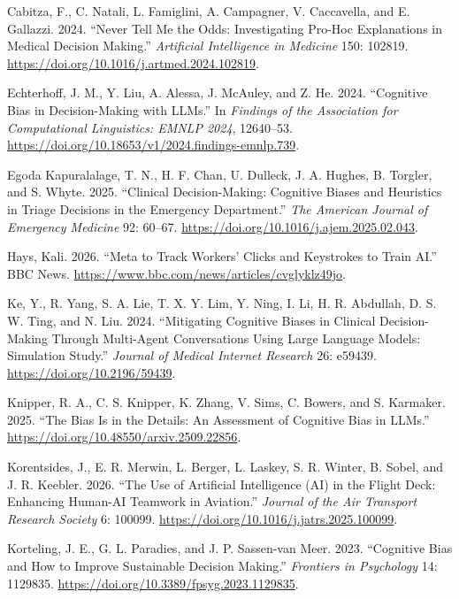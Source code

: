 \documentclass[
  letterpaper,
  DIV=11,
  numbers=noendperiod]{scrartcl}
\newlength{\cslhangindent}
\newenvironment{CSLReferences}[2] %
 {\begin{list}{}{%
  \setlength{\itemindent}{0pt}
  \setlength{\leftmargin}{0pt}
  \setlength{\parsep}{0pt}
  \ifodd #1
   \setlength{\leftmargin}{\cslhangindent}
   \setlength{\itemindent}{-1\cslhangindent}
  \fi
  \setlength{\itemsep}{#2\baselineskip}}}
 {\end{list}}
\begin{document}
\begin{CSLReferences}{1}{0}
Cabitza, F., C. Natali, L. Famiglini, A. Campagner, V. Caccavella, and
E. Gallazzi. 2024. {``Never Tell Me the Odds: {Investigating} Pro-Hoc
Explanations in Medical Decision Making.''} \emph{Artificial
Intelligence in Medicine} 150: 102819.
\url{https://doi.org/10.1016/j.artmed.2024.102819}.

Echterhoff, J. M., Y. Liu, A. Alessa, J. McAuley, and Z. He. 2024.
{``Cognitive Bias in Decision-Making with {LLMs}.''} In \emph{Findings
of the Association for Computational Linguistics: {EMNLP} 2024},
12640--53. \url{https://doi.org/10.18653/v1/2024.findings-emnlp.739}.

Egoda Kapuralalage, T. N., H. F. Chan, U. Dulleck, J. A. Hughes, B.
Torgler, and S. Whyte. 2025. {``Clinical Decision-Making: {Cognitive}
Biases and Heuristics in Triage Decisions in the Emergency
Department.''} \emph{The American Journal of Emergency Medicine} 92:
60--67. \url{https://doi.org/10.1016/j.ajem.2025.02.043}.

Hays, Kali. 2026. {``Meta to Track Workers' Clicks and Keystrokes to
Train AI.''} BBC News.
\url{https://www.bbc.com/news/articles/cvglyklz49jo}.

Ke, Y., R. Yang, S. A. Lie, T. X. Y. Lim, Y. Ning, I. Li, H. R.
Abdullah, D. S. W. Ting, and N. Liu. 2024. {``Mitigating Cognitive
Biases in Clinical Decision-Making Through Multi-Agent Conversations
Using Large Language Models: {Simulation} Study.''} \emph{Journal of
Medical Internet Research} 26: e59439.
\url{https://doi.org/10.2196/59439}.

Knipper, R. A., C. S. Knipper, K. Zhang, V. Sims, C. Bowers, and S.
Karmaker. 2025. {``The Bias Is in the Details: {An} Assessment of
Cognitive Bias in {LLMs}.''}
\url{https://doi.org/10.48550/arxiv.2509.22856}.

Korentsides, J., E. R. Merwin, L. Berger, L. Laskey, S. R. Winter, B.
Sobel, and J. R. Keebler. 2026. {``The Use of Artificial Intelligence
({AI}) in the Flight Deck: {Enhancing} Human-{AI} Teamwork in
Aviation.''} \emph{Journal of the Air Transport Research Society} 6:
100099. \url{https://doi.org/10.1016/j.jatrs.2025.100099}.

Korteling, J. E., G. L. Paradies, and J. P. Sassen-van Meer. 2023.
{``Cognitive Bias and How to Improve Sustainable Decision Making.''}
\emph{Frontiers in Psychology} 14: 1129835.
\url{https://doi.org/10.3389/fpsyg.2023.1129835}.


\end{CSLReferences}
\end{document}
